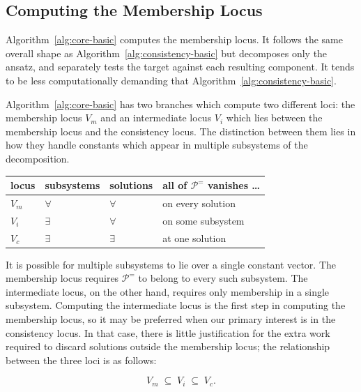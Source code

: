 \documentclass{article}
\theoremstyle{definition}
\theoremstyle{plain}
\begin{document}
\vfill\eject

\subsection{Computing the Membership Locus}
\label{sec:membership-locus}

Algorithm~\ref{alg:core-basic} computes the membership locus.  It follows the same
overall shape as Algorithm~\ref{alg:consistency-basic} but decomposes only the ansatz, and
separately tests the target against each resulting component.
It tends to be less computationally demanding that Algorithm~\ref{alg:consistency-basic}.

Algorithm~\ref{alg:core-basic} has two branches which compute two different loci: the membership
locus $V_m$ and an intermediate locus $V_i$ which lies
between the membership locus and the consistency locus.  The distinction
between them lies in how they handle constants which appear in multiple
subsystems of the decomposition.

\begin{center}
\begin{tabular}{llll}
\hline
locus & subsystems & solutions & all of $\mathcal{P}^=$ vanishes \ldots \\
\hline
$V_m$          & $\forall$ & $\forall$ & on every solution \\
$V_i$ & $\exists$ & $\forall$ & on some subsystem \\
$V_c$          & $\exists$ & $\exists$ & at one solution \\
\hline
\end{tabular}
\end{center}

It is possible for multiple subsystems to lie over a single constant vector.
The membership locus requires $\mathcal{P}^=$ to belong to every such subsystem.
The intermediate locus, on the other hand, requires only membership in a single subsystem.
Computing the intermediate locus is the first step in computing the membership locus,
so it may be preferred when our primary interest is in the consistency locus.
In that case, there is little justification for the extra work required
to discard solutions outside the membership locus; the relationship
between the three loci is as follows:

\begin{equation}
\label{eq:intermediate-sandwich}
V_m \;\subseteq\; V_i \;\subseteq\; V_c .
\end{equation}
\end{document}
